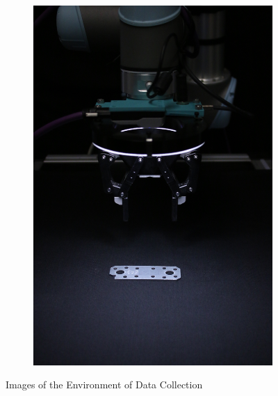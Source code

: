 \begin{figure}[htbp]
\begin{subfigure}[b]{0.3\textwidth}
    \end{subfigure}
    \begin{subfigure}[b]{0.3\textwidth}
        \centering
        \includegraphics[angle=90, width=\textwidth]{figures/setupimages/setup_close.JPG}


    \end{subfigure}
    \caption{Images of the Environment of Data Collection}
    \label{fig:setupofdatacollection}
\end{figure}

